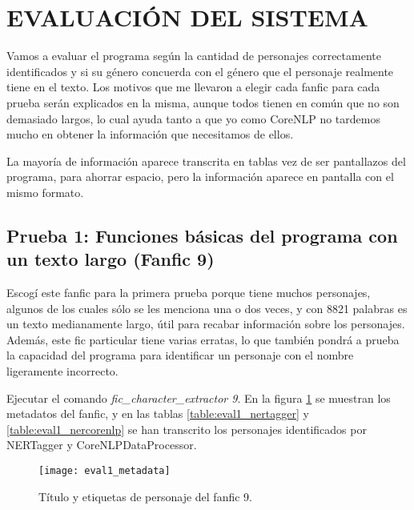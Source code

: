 \documentclass{pre-tfg}
\newcommand{\finalProgramName}{fic\_character\_extractor }
\begin{document}



\cleardoublepage
\section{EVALUACIÓN DEL SISTEMA}
\label{sec:evaluacion}

Vamos a evaluar el programa según la cantidad de personajes correctamente identificados y si su género concuerda con el género que el personaje realmente tiene en el texto. Los motivos que me llevaron a elegir cada fanfic para cada prueba serán explicados en la misma, aunque todos tienen en común que no son demasiado largos, lo cual ayuda tanto a que yo como CoreNLP no tardemos mucho en obtener la información que necesitamos de ellos.

La mayoría de información aparece transcrita en tablas vez de ser pantallazos del programa, para ahorrar espacio, pero la información aparece en pantalla con el mismo formato.

\subsection{Prueba 1: Funciones básicas del programa con un texto largo (Fanfic 9)}
Escogí este fanfic para la primera prueba porque tiene muchos personajes, algunos de los cuales sólo se les menciona una o dos veces, y con 8821 palabras es un texto medianamente largo, útil para recabar información sobre los personajes. Además, este fic particular tiene varias erratas, lo que también pondrá a prueba la capacidad del programa para identificar un personaje con el nombre ligeramente incorrecto.

Ejecutar el comando \textit{\finalProgramName 9}. En la figura \ref{fig:eval1_metadata} se muestran los metadatos del fanfic, y en las tablas \ref{table:eval1_nertagger} y \ref{table:eval1_nercorenlp} se han transcrito los personajes identificados por NERTagger y CoreNLPDataProcessor.

\begin{figure}[h]
	\centering
	\label{fig:eval1_metadata}
	\texttt{[image: eval1\_metadata]}
	\caption{Título y etiquetas de personaje del fanfic 9.}
\end{figure}
\end{document}
